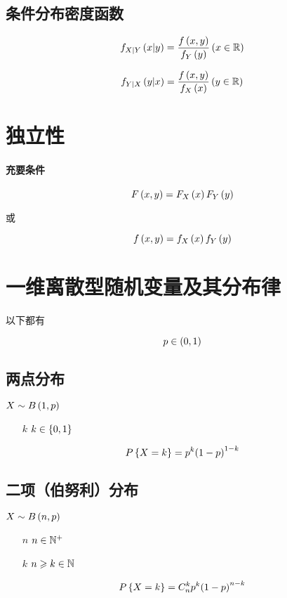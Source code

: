 \documentclass{article}
\begin{document}
\subsection{条件分布密度函数}

\[f_{X|Y}\left(x|y\right)=\frac{f\left(x,y\right)}{f_Y\left(y\right)}\left(x\in\mathbb R\right)\]

\[f_{Y|X}\left(y|x\right)=\frac{f\left(x,y\right)}{f_X\left(x\right)}\left(y\in\mathbb R\right)\]

\section{独立性}

\paragraph{充要条件}

\[F\left(x,y\right)=F_X\left(x\right)F_Y\left(y\right)\]

或

\[f\left(x,y\right)=f_X\left(x\right)f_Y\left(y\right)\]

\section{一维离散型随机变量及其分布律}

以下都有

\[p\in\left(0,1\right)\]

\subsection{两点分布}

$X\sim B\left(1,p\right)$

\begin{enumerate}
    \item [$k$] $k\in\left\{0,1\right\}$
\end{enumerate}

\[P\left\{X=k\right\}=p^k{\left(1-p\right)}^{1-k}\]

\subsection{二项（伯努利）分布}

$X\sim B\left(n,p\right)$

\begin{enumerate}
    \item [$n$] $n\in\mathbb N^+$
    \item [$k$] $n\geqslant k\in\mathbb N$
\end{enumerate}

\[P\left\{X=k\right\}=C_n^kp^k{\left(1-p\right)}^{n-k}\]
\end{document}
